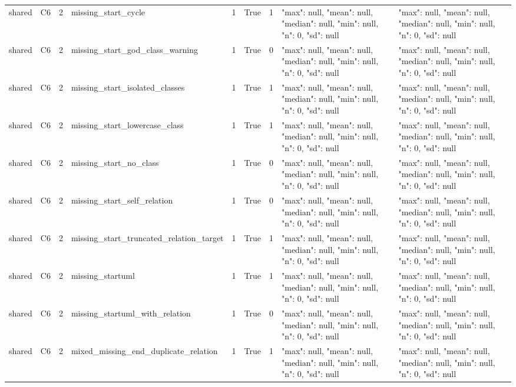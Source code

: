 \begin{tabular}{lllllllll}
shared & C6 & 2 & missing\_start\_cycle & 1 & True & 1 & {"max": null, "mean": null, "median": null, "min": null, "n": 0, "sd": null} & {"max": null, "mean": null, "median": null, "min": null, "n": 0, "sd": null} \\
shared & C6 & 2 & missing\_start\_god\_class\_warning & 1 & True & 0 & {"max": null, "mean": null, "median": null, "min": null, "n": 0, "sd": null} & {"max": null, "mean": null, "median": null, "min": null, "n": 0, "sd": null} \\
shared & C6 & 2 & missing\_start\_isolated\_classes & 1 & True & 1 & {"max": null, "mean": null, "median": null, "min": null, "n": 0, "sd": null} & {"max": null, "mean": null, "median": null, "min": null, "n": 0, "sd": null} \\
shared & C6 & 2 & missing\_start\_lowercase\_class & 1 & True & 1 & {"max": null, "mean": null, "median": null, "min": null, "n": 0, "sd": null} & {"max": null, "mean": null, "median": null, "min": null, "n": 0, "sd": null} \\
shared & C6 & 2 & missing\_start\_no\_class & 1 & True & 0 & {"max": null, "mean": null, "median": null, "min": null, "n": 0, "sd": null} & {"max": null, "mean": null, "median": null, "min": null, "n": 0, "sd": null} \\
shared & C6 & 2 & missing\_start\_self\_relation & 1 & True & 0 & {"max": null, "mean": null, "median": null, "min": null, "n": 0, "sd": null} & {"max": null, "mean": null, "median": null, "min": null, "n": 0, "sd": null} \\
shared & C6 & 2 & missing\_start\_truncated\_relation\_target & 1 & True & 1 & {"max": null, "mean": null, "median": null, "min": null, "n": 0, "sd": null} & {"max": null, "mean": null, "median": null, "min": null, "n": 0, "sd": null} \\
shared & C6 & 2 & missing\_startuml & 1 & True & 1 & {"max": null, "mean": null, "median": null, "min": null, "n": 0, "sd": null} & {"max": null, "mean": null, "median": null, "min": null, "n": 0, "sd": null} \\
shared & C6 & 2 & missing\_startuml\_with\_relation & 1 & True & 0 & {"max": null, "mean": null, "median": null, "min": null, "n": 0, "sd": null} & {"max": null, "mean": null, "median": null, "min": null, "n": 0, "sd": null} \\
shared & C6 & 2 & mixed\_missing\_end\_duplicate\_relation & 1 & True & 1 & {"max": null, "mean": null, "median": null, "min": null, "n": 0, "sd": null} & {"max": null, "mean": null, "median": null, "min": null, "n": 0, "sd": null} \\

\end{tabular}
